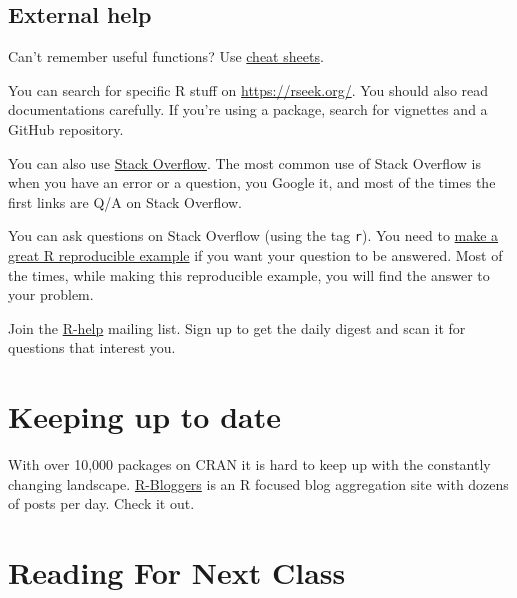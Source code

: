 \documentclass[]{book}
\theoremstyle{definition}
\theoremstyle{definition}
\theoremstyle{definition}
\theoremstyle{remark}
\begin{document}
\subsection{External help}\label{external-help}

Can't remember useful functions? Use
\href{https://www.rstudio.com/resources/cheatsheets/}{cheat sheets}.

You can search for specific R stuff on \url{https://rseek.org/}. You
should also read documentations carefully. If you're using a package,
search for vignettes and a GitHub repository.

You can also use \href{https://stackoverflow.com/}{Stack Overflow}. The
most common use of Stack Overflow is when you have an error or a
question, you Google it, and most of the times the first links are Q/A
on Stack Overflow.

You can ask questions on Stack Overflow (using the tag \texttt{r}). You
need to
\href{https://stackoverflow.com/questions/5963269/how-to-make-a-great-r-reproducible-example}{make
a great R reproducible example} if you want your question to be
answered. Most of the times, while making this reproducible example, you
will find the answer to your problem.

Join the \href{https://www.r-project.org/mail.html}{R-help} mailing
list. Sign up to get the daily digest and scan it for questions that
interest you.

\section{Keeping up to date}\label{keeping-up-to-date}

With over 10,000 packages on CRAN it is hard to keep up with the
constantly changing landscape.
\href{https://www.r-bloggers.com/}{R-Bloggers} is an R focused blog
aggregation site with dozens of posts per day. Check it out.

\section{Reading For Next Class}\label{reading-for-next-class}
\end{document}
